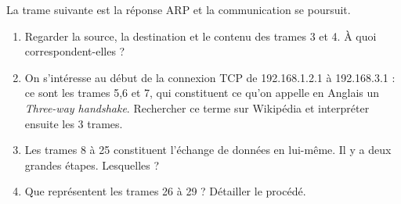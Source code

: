 \begin{exercice}[]
\begin{enumerate}
              La trame suivante est la réponse ARP et la communication se poursuit.
    \end{enumerate}
    \begin{enumerate}
        \item 	Regarder la source, la destination et le contenu des trames 3 et 4. À quoi correspondent-elles ?
        \item 	On s'intéresse au début de la connexion TCP de 192.168.1.2.1 à 192.168.3.1 : ce sont les trames 5,6 et 7, qui constituent ce qu'on appelle en Anglais un \textit{Three-way handshake}. Rechercher ce terme sur Wikipédia et interpréter ensuite les 3 trames.
        \item 	Les trames 8 à 25 constituent l'échange de données en lui-même. Il y a deux grandes étapes. Lesquelles ?
        \item 	Que représentent les trames 26 à 29 ? Détailler le procédé.
    \end{enumerate}
\end{exercice}
